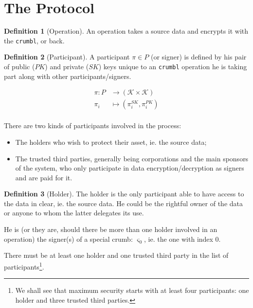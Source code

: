 \documentclass[twoside,twocolumn]{article}
\theoremstyle{definition}
\newtheorem{definition}{Definition}
\theoremstyle{remark}
\begin{document}
\section{The Protocol}

\begin{definition}[Operation]
    An operation takes a source data and encrypts it with the \texttt{crumbl}, or back.
\end{definition}

\begin{definition}[Participant]
    \label{participant}
    A participant $\pi \in P$ (or signer) is defined by his pair of public ($PK$) and private ($SK$) keys unique to an \texttt{crumbl} operation 
    he is taking part along with other participants/signers.

    \begin{equation}
        \label{eq:participant}
        \begin{array}{rl}
            \pi: P &\to (\mathcal{K} \times \mathcal{K}) \\
                \pi_i &\mapsto (\pi_i^{SK}, \pi_i^{PK}) \\
        \end{array}
    \end{equation}

    There are two kinds of participants involved in the process:
    \begin{itemize}
        \item The holders who wish to protect their asset, ie. the source data;
        \item The trusted third parties, generally being corporations and the main sponsors of the system, who only participate in data 
            encryption/decryption as signers and are paid for it.
    \end{itemize}
\end{definition}

\begin{definition}[Holder]
    The holder is the only participant able to have access to the data in clear, ie. the source data.
    He could be the rightful owner of the data or anyone to whom the latter delegates its use.

    He is (or they are, should there be more than one holder involved in an operation) the signer(s) of a special crumb: $\varsigma_0$, ie. the one 
    with index $0$.
\end{definition}

There must be at least one holder and one trusted third party in the list of participants\footnote{We shall see that maximum security starts with at 
least four participants: one holder and three trusted third parties.}.
\end{document}
